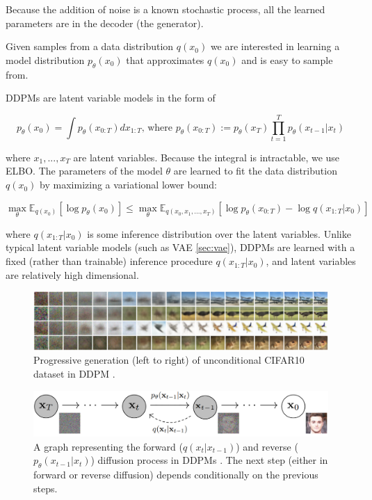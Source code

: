 Because the addition of noise is a known stochastic process, all the learned parameters are in the decoder (the generator).

Given samples from a data distribution $q(x_0)$ we are interested in learning a model distribution $p_\theta (x_0)$ that approximates $q(x_0)$ and is easy to sample from.

DDPMs are latent variable models in the form of 

\begin{equation}
    p_\theta (x_0) = \int p_\theta(x_{0:T}) dx_{1:T} \text{,\ \ where \ \ \ } p_\theta (x_{0:T}) := p_\theta (x_T) \prod_{t=1}^{T} p_\theta (x_{t-1} | x_t)
\end{equation}

where $x_1, ..., x_T$ are latent variables. Because the integral is intractable, we use ELBO. The parameters of the model $\theta$ are learned to fit the data distribution $q(x_0)$ by maximizing a variational lower bound:

\begin{equation}
    \max_{\theta} \mathbb{E}_{q(x_0)} [\log p_\theta (x_0)] \leq \max_\theta \mathbb{E}_{q(x_0, x_1, ..., x_T)} [\log p_\theta (x_{0:T}) - \log q(x_{1:T} | x_0)]
\end{equation}

where $q(x_{1:T} | x_0)$ is some inference distribution over the latent variables. Unlike typical latent variable models (such as VAE \ref{sec:vae}), DDPMs are learned with a fixed (rather than trainable) inference procedure $q(x_{1:T} | x_0)$, and latent variables are relatively high dimensional.


\begin{figure}
    \centering
    \includegraphics[width=1\textwidth]{images/diffusion_models/ddpm_denoise.png}
    \caption{Progressive generation (left to right) of unconditional CIFAR10 dataset in DDPM \cite{ddpm}.}
\end{figure}


\begin{figure}
    \centering
    \includegraphics[width=1\textwidth]{images/diffusion_models/ddpm_process.png}
    \caption{A graph representing the forward ($q(x_t | x_{t-1})$) and reverse ($p_\theta(x_{t-1} | x_t)$) diffusion process in DDPMs \cite{ddpm}. The next step (either in forward or reverse diffusion) depends conditionally on the previous steps.}
    \label{fig:ddpm_process}
\end{figure}







